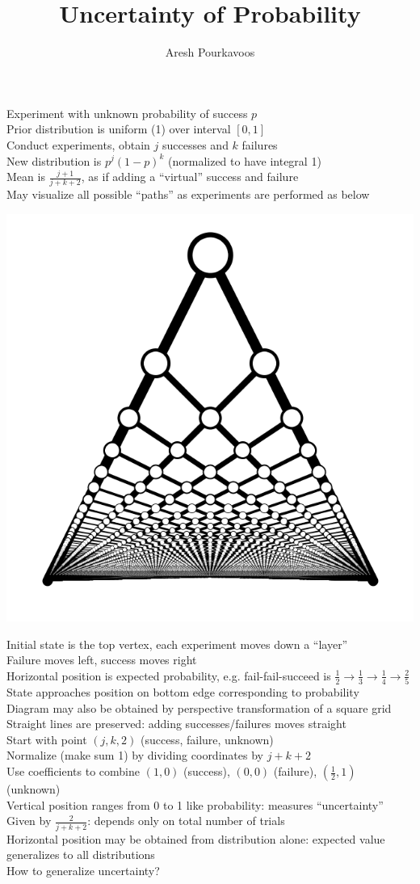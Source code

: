 \documentclass{article}
\begin{document}
\title{Uncertainty of Probability}
\author{Aresh Pourkavoos}
\maketitle

Experiment with unknown probability of success $p$ \\
Prior distribution is uniform (1) over interval $[0, 1]$ \\
Conduct experiments, obtain $j$ successes and $k$ failures \\
New distribution is $p^j(1-p)^k$ (normalized to have integral 1) \\
Mean is $\frac{j+1}{j+k+2}$,
as if adding a ``virtual'' success and failure \\
May visualize all possible ``paths'' as experiments are performed
as below
\begin{center}
\includegraphics[width=0.5\linewidth]{grid.png}
\end{center}
Initial state is the top vertex, each experiment moves down a ``layer'' \\
Failure moves left, success moves right \\
Horizontal position is expected probability, e.g. fail-fail-succeed is
$\frac{1}{2} \rightarrow \frac{1}{3} \rightarrow \frac{1}{4} \rightarrow \frac{2}{5}$ \\
State approaches position on bottom edge corresponding to probability \\

Diagram may also be obtained by perspective transformation of a square grid \\
Straight lines are preserved: adding successes/failures moves straight \\
Start with point $(j, k, 2)$ (success, failure, unknown) \\
Normalize (make sum 1) by dividing coordinates by $j+k+2$ \\
Use coefficients to combine $(1, 0)$ (success), $(0, 0)$ (failure),
$\left(\frac{1}{2}, 1\right)$ (unknown) \\
Vertical position ranges from 0 to 1 like probability: measures ``uncertainty'' \\
Given by $\frac{2}{j+k+2}$: depends only on total number of trials \\
Horizontal position may be obtained from distribution alone:
expected value generalizes to all distributions \\
How to generalize uncertainty? \\
\end{document}
